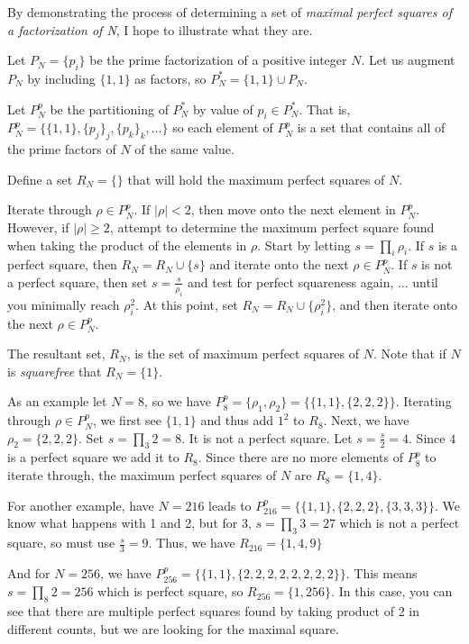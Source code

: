\documentclass[11pt]{amsart}
\theoremstyle{mydef}
\begin{document}
By demonstrating the process of determining a set of \textit{maximal perfect squares of a factorization of N}, I hope to illustrate what they are.

Let $P_N = \{p_i\}$ be the prime factorization of a positive integer $N$. Let us augment $P_N$ by including $\{1, 1\}$ as factors, so $P^*_N = \{1, 1\} \cup P_N$.

Let $P^p_N$ be the partitioning of $P^*_N$ by value of $p_i \in P^*_N$. That is, $P^p_N = \{ \{ 1, 1 \}, \{ p_j \}_j, \{ p_k \}_k, \ldots \}$ so each element of $P^p_N$ is a set that contains all of the prime factors of $N$ of the same value. 

Define a set $R_N = \{ \}$ that will hold the maximum perfect squares of $N$. 

Iterate through $\rho \in P^p_N$. If $\left\vert \rho \right\vert < 2$, then move onto the next element in $P^p_N$. However, if $\left\vert \rho \right\vert \ge 2$, attempt to determine the maximum perfect square found when taking the product of the elements in $\rho$. Start by letting $s = \prod\limits_i \rho_i$. If $s$ is a perfect square, then $R_N = R_N \cup \{ s \}$ and iterate onto the next $\rho \in P^p_N$. If $s$ is not a perfect square, then set $s = \frac{s}{\rho_i}$ and test for perfect squareness again, ... until you minimally reach $\rho^2_i$. At this point, set $R_N = R_N \cup \{ \rho^2_i \}$, and then iterate onto the next  $\rho \in P^p_N$.

The resultant set, $R_N$, is the set of maximum perfect squares of $N$. Note that if $N$ is \textit{squarefree} that $R_N = \{ 1 \}$. 

As an example let $N=8$, so we have $P^p_8 = \{ \rho_1, \rho_2 \} = \{ \{1,1\}, \{2, 2, 2\} \}$. Iterating through $\rho \in P^p_N$, we first see $\{1,1\}$ and thus add $1^2$ to $R_8$. Next, we have $\rho_2 = \{ 2, 2, 2 \}$. Set $s = \prod\limits_3 2 = 8$. It is not a perfect square. Let $s = \frac{s}{2} = 4$. Since $4$ is a perfect square we add it to $R_8$. Since there are no more elements of $P^p_8$ to iterate through, the maximum perfect squares of $N$ are $R_8 = \{ 1, 4 \}$.

For another example, have $N=216$ leads to $P^p_{216} = \{ \{1,1\}, \{2, 2, 2 \}, \{3, 3, 3\} \}$. We know what happens with 1 and 2, but for 3, $s = \prod\limits_3 3=27$ which is not a perfect square, so must use $\frac{s}{3}=9$. Thus, we have $R_{216} = \{ 1, 4, 9 \}$

And for $N=256$, we have $P^p_{256} = \{ \{1,1\}, \{2, 2, 2, 2, 2, 2, 2, 2\} \}$. This means $s = \prod\limits_8 2 = 256$ which is perfect square, so $R_{256} = \{ 1, 256 \}$. In this case, you can see that there are multiple perfect squares found by taking product of 2 in different counts, but we are looking for the maximal square.
\end{document}

